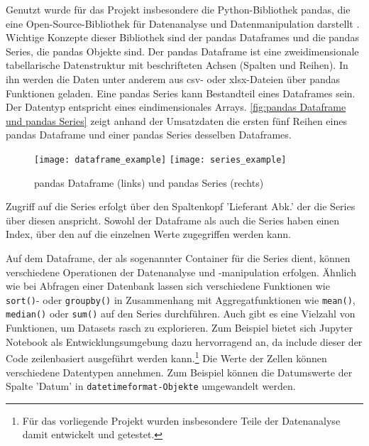     
    Genutzt wurde für das Projekt insbesondere die Python-Bibliothek pandas, die eine Open-Source-Bibliothek für Datenanalyse und 
    Datenmanipulation darstellt \cite[vgl.][]{pandas_pandas_2021}. 
    Wichtige Konzepte dieser Bibliothek sind der pandas Dataframes und die pandas Series, die pandas Objekte sind. Der pandas Dataframe ist eine zweidimensionale 
    tabellarische Datenstruktur mit beschrifteten Achsen (Spalten und Reihen). In ihn
    werden die Daten unter anderem aus csv- oder xlsx-Dateien über pandas Funktionen geladen.
    Eine pandas Series kann Bestandteil eines Dataframes sein. Der Datentyp entspricht eines eindimensionales Arrays. \autoref{fig:pandas Dataframe und pandas Series} zeigt anhand der Umsatzdaten die ersten fünf Reihen
    eines pandas Dataframe und einer pandas Series desselben Dataframes. 
    
    
    \begin{figure}[H]
        \centering
            \texttt{[image: dataframe\_example]}
            \hspace{1cm}
            \texttt{[image: series\_example]}
            \caption{pandas Dataframe (links) und pandas Series (rechts)}
            \label{fig:pandas Dataframe und pandas Series}
    \end{figure}

    Zugriff auf die Series erfolgt über
    den Spaltenkopf 'Lieferant Abk.' der die Series über diesen anspricht. Sowohl der Dataframe als auch die Series haben einen Index, 
    über den auf die einzelnen Werte zugegriffen werden kann. 
    
    Auf dem Dataframe, der als sogenannter Container für die Series dient, können verschiedene Operationen der Datenanalyse und 
    -manipulation erfolgen. Ähnlich wie bei Abfragen einer Datenbank lassen sich verschiedene Funktionen wie \texttt{sort()}- oder \texttt{groupby()}
    in Zusammenhang mit Aggregatfunktionen wie \texttt{mean()}, \texttt{median()} oder \texttt{sum()} auf den Series durchführen.
    Auch gibt es eine Vielzahl von Funktionen, um Datasets rasch zu explorieren. Zum Beispiel bietet sich Jupyter Notebook als
    Entwicklungsumgebung dazu hervorragend an, da include dieser der Code zeilenbasiert ausgeführt werden kann.\footnote{Für das vorliegende Projekt wurden 
    insbesondere Teile der Datenanalyse damit entwickelt und getestet.} Die Werte der Zellen können verschiedene Datentypen
    annehmen. Zum Beispiel können die Datumswerte der Spalte 'Datum' in \texttt{datetimeformat-Objekte} umgewandelt werden.

